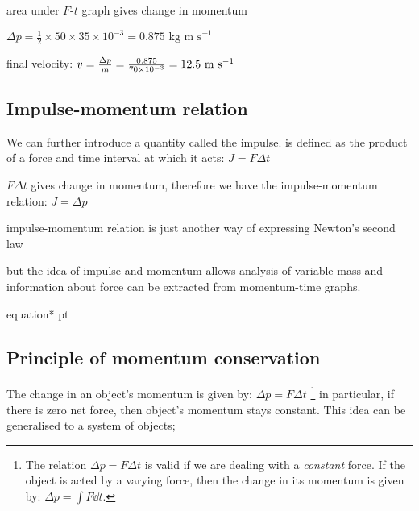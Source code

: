 
\begin{soln} area under $F$-$t$ graph gives change in momentum

{
	\centering
	
	$ \Delta p = \frac{1}{2} \times 50 \times 35\times10^{-3} = 0.875 \text{ kg m s}^{-1} $
	
}

final velocity: $v = \frac{\Delta p}{m} = \frac{0.875}{70\times10^{-3}} = 12.5 \text{ m s$^{-1}$} $ \end{soln}


\subsection{Impulse-momentum relation}

We can further introduce a quantity called the impulse.  is defined as the product of a force and time interval at which it acts: $J = F \Delta t$

$F\Delta t$ gives change in momentum, therefore we have the  impulse-momentum relation: $J=\Delta p$

\cmt impulse-momentum relation is just another way of expressing Newton's second law

but the idea of impulse and momentum allows analysis of variable mass and information about force can be extracted from momentum-time graphs.

{
	\centering
	
	\begin{empheq}[box=\tcbhighmath]{equation*}{  p\text{-}t  }\end{empheq}
	
}




\subsection{Principle of momentum conservation}\label{ch:momentum-conservation}

The change in an object's momentum is given by: $\Delta p = F \Delta t$
\footnote[][-4cm]{The relation $\Delta p = F \Delta t$ is valid if we are dealing with a \emph{constant} force. If the object is acted by a varying force, then the change in its momentum is given by: $\Delta p = \int F \dd t$.}
in particular, if there is zero net force, then object's momentum stays constant. This idea can be generalised to a system of objects;

